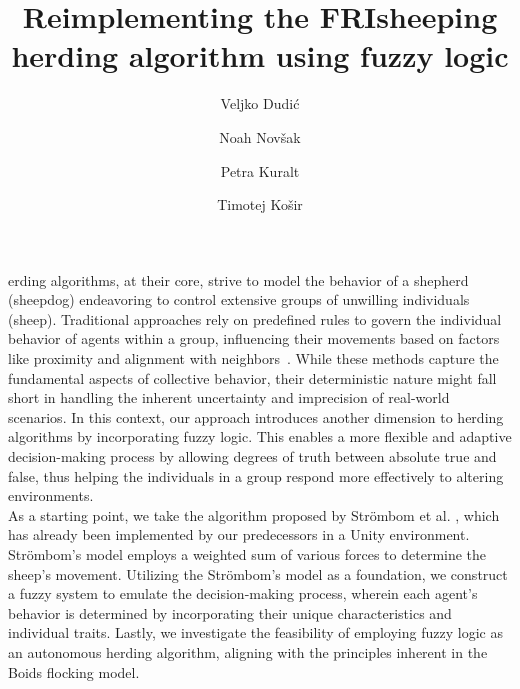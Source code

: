 \documentclass[9pt]{pnas-new}
\title{Reimplementing the FRIsheeping herding algorithm using fuzzy logic}
\author{Veljko Dudić}
\author{Noah Novšak}
\author{Petra Kuralt}
\author{Timotej Košir}
\affil{Collective behavior course research seminar report}
\begin{document}
\verticaladjustment{-2pt}

\maketitle
\thispagestyle{firststyle}

erding algorithms, at their core, strive to model the behavior of a shepherd (sheepdog) endeavoring to control extensive groups of unwilling individuals (sheep).
Traditional approaches rely on predefined rules to govern the individual behavior of agents within a group, influencing their movements based on factors like proximity and alignment with neighbors~\cite{basicHerding}. While these methods capture the fundamental aspects of collective behavior, their deterministic nature might fall short in handling the inherent uncertainty and imprecision of real-world scenarios. In this context, our approach introduces another dimension to herding algorithms by incorporating fuzzy logic. This enables a more flexible and adaptive decision-making process by allowing degrees of truth between absolute true and false, thus helping the individuals in a group respond more effectively to altering environments.\\
As a starting point, we take the algorithm proposed by Str\"{o}mbom et al. \cite{strombom}, which has already been implemented by our predecessors in a Unity environment. Str\"{o}mbom's model employs a weighted sum of various forces to determine the sheep's movement. Utilizing the Str\"{o}mbom's model as a foundation, we construct a fuzzy system to emulate the decision-making process, wherein each agent's behavior is determined by incorporating their unique characteristics and individual traits. Lastly, we investigate the feasibility of employing fuzzy logic as an autonomous herding algorithm, aligning with the principles inherent in the Boids flocking model.


\end{document}
